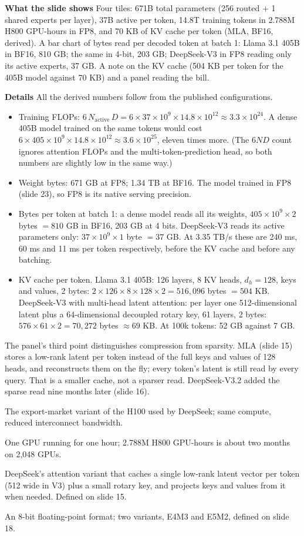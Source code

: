 \documentclass[11pt,letterpaper]{article}
\newcommand{\para}[1]{\medskip\noindent\textbf{#1}\quad}
\newenvironment{terms}{\begin{tcolorbox}[termsbox]\begin{description}[leftmargin=1.1em,itemsep=3pt,topsep=2pt,font=\normalfont]}{\end{description}\end{tcolorbox}}
\newcommand{\term}[2]{\item[\textbf{#1}]\index{#1} #2}
\newcommand{\Nact}{N_{\mathrm{active}}}
\begin{document}
\para{What the slide shows} Four tiles: 671B total parameters (256 routed + 1 shared experts per layer), 37B active per token, 14.8T training tokens in 2.788M H800 GPU-hours in FP8, and 70 KB of KV cache per token (MLA, BF16, derived). A bar chart of bytes read per decoded token at batch 1: Llama 3.1 405B in BF16, 810 GB; the same in 4-bit, 203 GB; DeepSeek-V3 in FP8 reading only its active experts, 37 GB. A note on the KV cache (504 KB per token for the 405B model against 70 KB) and a panel reading the bill.

\para{Details} All the derived numbers follow from the published configurations.
\begin{itemize}
  \item Training FLOPs: $6\,\Nact\,D = 6\times37\times10^{9}\times14.8\times10^{12}\approx3.3\times10^{24}$. A dense 405B model trained on the same tokens would cost $6\times405\times10^9\times14.8\times10^{12}\approx3.6\times10^{25}$, eleven times more. (The $6ND$ count ignores attention FLOPs and the multi-token-prediction head, so both numbers are slightly low in the same way.)
  \item Weight bytes: 671 GB at FP8; 1.34 TB at BF16. The model trained in FP8 (slide 23), so FP8 is its native serving precision.
  \item Bytes per token at batch 1: a dense model reads all its weights, $405\times10^9\times2$ bytes $=810$ GB in BF16, 203 GB at 4 bits. DeepSeek-V3 reads its active parameters only: $37\times10^9\times1$ byte $=37$ GB. At 3.35 TB/s these are 240 ms, 60 ms and 11 ms per token respectively, before the KV cache and before any batching.
  \item KV cache per token. Llama 3.1 405B: 126 layers, 8 KV heads, $d_h=128$, keys and values, 2 bytes: $2\times126\times8\times128\times2=516{,}096$ bytes $=504$ KB. DeepSeek-V3 with multi-head latent attention: per layer one 512-dimensional latent plus a 64-dimensional decoupled rotary key, 61 layers, 2 bytes: $576\times61\times2=70{,}272$ bytes $\approx69$ KB. At 100k tokens: 52 GB against 7 GB.
\end{itemize}
The panel's third point distinguishes compression from sparsity. MLA (slide 15) stores a low-rank latent per token instead of the full keys and values of 128 heads, and reconstructs them on the fly; every token's latent is still read by every query. That is a smaller cache, not a sparser read. DeepSeek-V3.2 added the sparse read nine months later (slide 16).

\begin{terms}
\term{H800}{The export-market variant of the H100 used by DeepSeek; same compute, reduced interconnect bandwidth.}
\term{GPU-hour}{One GPU running for one hour; 2.788M H800 GPU-hours is about two months on 2,048 GPUs.}
\term{multi-head latent attention (MLA)}{DeepSeek's attention variant that caches a single low-rank latent vector per token (512 wide in V3) plus a small rotary key, and projects keys and values from it when needed. Defined on slide 15.}
\term{FP8}{An 8-bit floating-point format; two variants, E4M3 and E5M2, defined on slide 18.}
\end{terms}
\end{document}
